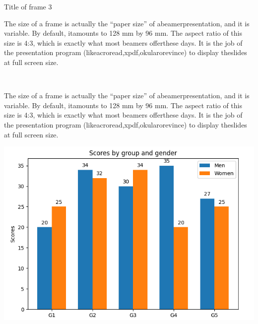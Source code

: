 \documentclass{beamer}
\begin{document}
\begin{frame}{Title of frame 3}
    \small
    \begin{gridlayout}{\textwidth}{0.67\textwidth}
      \begin{row}{0.627}
        \begin{cell}{0.446}
          The size of a frame is actually the “paper size” of abeamerpresentation, and it is variable. By default, itamounts to 128 mm by 96 mm. The aspect ratio of this size is 4:3, which is exactly what most beamers offerthese days. It is the job of the presentation program (likeacroread,xpdf,okularorevince) to display theslides at full screen size.
        \end{cell}
        \begin{cell}{0.077}
          ~
        \end{cell}
        \begin{cell}{0.475}
          The size of a frame is actually the “paper size” of abeamerpresentation, and it is variable. By default, itamounts to 128 mm by 96 mm. The aspect ratio of this size is 4:3, which is exactly what most beamers offerthese days. It is the job of the presentation program (likeacroread,xpdf,okularorevince) to display theslides at full screen size.
        \end{cell}
      \end{row}
      \begin{row}{0.373}
        \begin{cell}{0.445}
          \centering
          \includegraphics[height = \rowheight]{img/matplotlib-graph.png}
        \end{cell}
        \begin{cell}{0.079}

\end{cell}
\end{row}
\end{gridlayout}
\end{frame}
\end{document}
